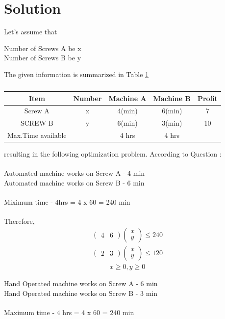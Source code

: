 \documentclass[journal,10pt]{article}
\newcommand{\myvec}[1]{\ensuremath{\begin{pmatrix}#1\end{pmatrix}}}
\begin{document}
\section*{Solution}
Let's assume that
\begin{center}
Number of Screws A be x\\
Number of Screws B be y\\
\end{center}
\fi
The given information is summarized in Table 
		\ref{table:12/12/2/5}
\begin{table}[!ht]
	\centering
\begin{tabular}{|c|c|c|c|c|}
	\hline
	\textbf{Item}&\textbf{Number}&\textbf{Machine A}&\textbf{Machine B}&\textbf{Profit}\\
	\hline
	Screw A&x&4(min)&6(min)&7\\
	\hline
	SCREW B&y&6(min)&3(min)&10\\
	\hline
	Max.Time available& &4 hrs&4 hrs&\\
	\hline
\end{tabular}
	\caption{}
		\label{table:12/12/2/5}
\end{table}
resulting in the following optimization problem.
\iffalse
According to Question : \\\\
Automated machine works on Screw A - 4 min\\
Automated machine works on Screw B - 6 min\\\\
Miximum time - 4hrs = 4 x 60 = 240 min\\\\
Therefore,
\begin{align}
	\myvec{4 &6}\myvec{x\\y} \leq 240
\end{align}
\begin{align}
	\myvec{2&3} \myvec{x\\y} \leq 120	
\end{align}
\begin{align}
	x \geq 0 , y \geq 0
\end{align}

Hand Operated machine works on Screw A - 6 min\\
Hand Operated machine works on Screw B - 3 min\\\\
Maximum time - 4 hrs = 4 x 60 = 240 min
\end{document}
